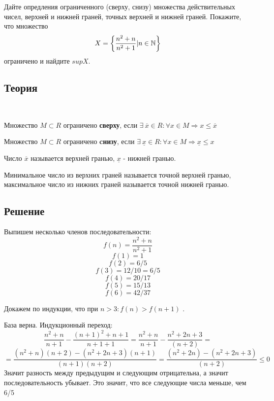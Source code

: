 Дайте опредления ограниченного (сверху, снизу) множества действительных чисел, верхней и нижней граней, точных верхней и нижней граней. Покажите, что множество 
\[
X = \left\{ \frac{n^2 + n}{n^2 + 1}| n \in \mathbb{N} \right\}
\]
ограничено и найдите $sup X$.

\subsection*{Теория}

\begin{definition}
	\
	
	Множество $M \subset R$ ограничено \textbf{сверху}, если $\exists \ \overline{x} \in R: \forall x \in M \Rightarrow   x \leq \overline{x}$

	Множество $M \subset R$ ограничено \textbf{cнизу}, если $\exists \ \underline{x} \in R: \forall x \in M \Rightarrow   \underline{x} \leq x$
	
	Число $\overline{x}$ называется верхней гранью, $\underline{x}$ - нижней гранью.
	
	Минимальное число из верхних граней называется точной верхней гранью, максимальное число из нижних граней называется точной нижней гранью.
\end{definition}


\subsection*{Решение}
Выпишем несколько членов последовательности:
\[
f(n) = \frac{n^2 + n}{n^2 + 1}
\]
\[
f(1) = 1
\]
\[
f(2) = 6/5
\]
\[
f(3) = 12/10 = 6/5
\]
\[
f(4) = 20/17
\]
\[
f(5) = 15/13
\]
\[
f(6) = 42/37
\]

Докажем по индукции, что при $n > 3: f(n) > f(n + 1)$ .

База верна. Индукционный переход:
\[
\frac{n^2 + n}{n + 1} - \frac{(n+1)^2 + n + 1}{n + 1 + 1} 
=
\frac{n^2 + n}{n + 1} - \frac{n^2 + 2n + 3}{(n + 2)}
=
\]
\[
=
\frac{(n^2 + n)(n + 2) - (n^2 + 2n + 3)(n + 1)}{(n + 1)(n + 2)}
=
\frac{(n^2 + 2n) - (n^2 + 2n + 3)}{(n + 2)} \leqslant 0
\]
Значит разность между предыдущим и следующим отрицательна, а значит последовательность убывает. Это значит, что все следующие числа меньше, чем 6/5
